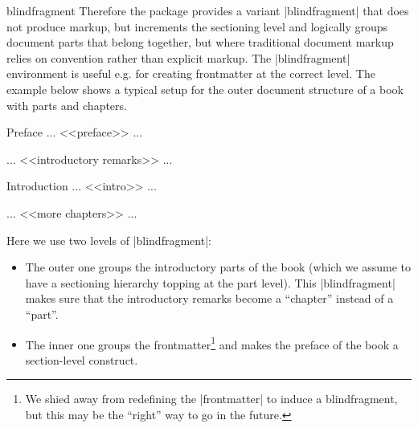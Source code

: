 \begin{environment}{blindfragment}
  Therefore the  package provides a variant |blindfragment| that
  does not produce markup, but increments the sectioning level and logically groups
  document parts that belong together, but where traditional document markup relies on
  convention rather than explicit markup. The |blindfragment| environment is useful
  e.g. for creating frontmatter at the correct level. The example below shows a typical
  setup for the outer document structure of a book with parts and chapters.
  
\begin{latexcode}

\begin{blindfragment}
\begin{blindfragment}
\begin{frontmatter}
\maketitle\newpage
\begin{sfragment}{Preface}
... <<preface>> ...
\end{sfragment}
\clearpage\setcounter{tocdepth}{4}\tableofcontents\clearpage
\end{frontmatter}
\end{blindfragment}
... <<introductory remarks>> ...
\end{blindfragment}
\begin{sfragment}{Introduction}
... <<intro>> ...
\end{sfragment}
... <<more chapters>> ... 


\end{latexcode}

Here we use two levels of |blindfragment|:
\begin{itemize}
\item The outer one groups the introductory parts of the book (which we assume to have a
  sectioning hierarchy topping at the part level). This |blindfragment| makes sure that
  the introductory remarks become a ``chapter'' instead of a ``part''.
\item The inner one groups the frontmatter\footnote{We shied away from redefining the
    |frontmatter| to induce a blindfragment, but this may be the ``right'' way to go in
    the future.} and makes the preface of the book a section-level construct.
\end{itemize}
\end{environment}

